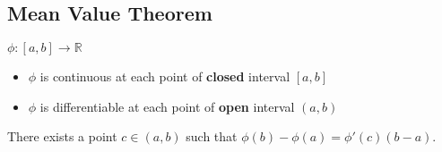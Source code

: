 \subsection{Mean Value Theorem}
	\label{thm_mvt}
	\thmIF $\phi:[a,b]\to\mathbb{R}$
	\begin{itemize}
		\item $\phi$ is continuous at each point of \textbf{closed} interval $[a, b]$
		\item $\phi$ is differentiable at each point of \textbf{open} interval $(a, b)$
	\end{itemize}
	\thmTHEN There exists a point $c \in (a,b)$ such that
		$\phi(b)-\phi(a) = \phi'(c)(b-a)$.